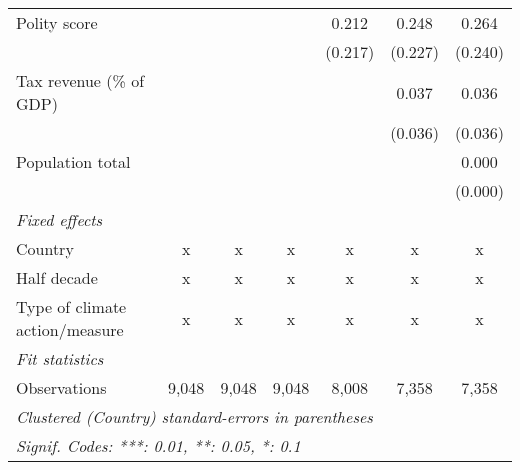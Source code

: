 \begin{tabular}{lcccccc}
   Polity score                                                               &         &               &               & 0.212         & 0.248         & 0.264\\   
                                                                              &         &               &               & (0.217)       & (0.227)       & (0.240)\\   
   Tax revenue (\% of GDP)                                                    &         &               &               &               & 0.037         & 0.036\\   
                                                                              &         &               &               &               & (0.036)       & (0.036)\\   
   Population total                                                           &         &               &               &               &               & 0.000\\   
                                                                              &         &               &               &               &               & (0.000)\\   
   \emph{Fixed effects}\\
   Country                                                                    & x       & x             & x             & x             & x             & x\\  
   Half decade                                                                & x       & x             & x             & x             & x             & x\\  
   Type of climate action/measure                                             & x       & x             & x             & x             & x             & x\\  
   \midrule \emph{Fit statistics}\\
   Observations                                                               & 9,048   & 9,048         & 9,048         & 8,008         & 7,358         & 7,358\\  
   \midrule
   \multicolumn{7}{l}{\emph{Clustered (Country) standard-errors in parentheses}}\\
   \multicolumn{7}{l}{\emph{Signif. Codes: ***: 0.01, **: 0.05, *: 0.1}}\\
\end{tabular}
\par\endgroup


